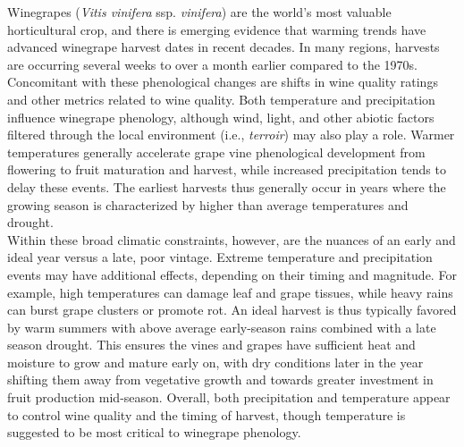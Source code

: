 \documentclass[final]{nature}
\begin{document}
\noindent Winegrapes (\emph{Vitis vinifera} ssp. \emph{vinifera}) are the world's most valuable horticultural crop, and there is emerging evidence that warming trends have advanced winegrape harvest dates in recent decades\cite{Jones:2000br,schultzjones,tomasi2011,odo2012,webb2012}. In many regions, harvests are occurring several weeks to over a month earlier compared to the 1970s\cite{Duchene:2005bd,Seguin2005,webb2011}. Concomitant with these phenological changes are shifts in wine quality ratings\cite{jones2005} and other metrics related to wine quality\cite{Jones:2000br,mori2007}. Both temperature and precipitation influence winegrape phenology, although wind, light, and other abiotic factors filtered through the local environment (i.e., \emph{terroir}) may also play a role\cite{Gladstones2011}. Warmer temperatures generally accelerate grape vine phenological development from flowering to fruit maturation and harvest, while increased precipitation tends to delay these events\cite{jones2013}. The earliest harvests thus generally occur in years where the growing season is characterized by higher than average temperatures and drought\cite{Jones:2000br}.\\
\indent Within these broad climatic constraints, however, are the nuances of an early and ideal year versus a late, poor vintage. Extreme temperature and precipitation events may have additional effects, depending on their timing and magnitude. For example, high temperatures can damage leaf and grape tissues\cite{greer2010,Gladstones2011}, while heavy rains can burst grape clusters or promote rot\cite{jones2013}. An ideal harvest is thus typically favored by warm summers with above average early-season rains combined with a late season drought. This ensures the vines and grapes have sufficient heat and moisture to grow and mature early on, with dry conditions later in the year shifting them away from vegetative growth and towards greater investment in fruit production mid-season\cite{chaves2010,jones2013,baciocco2014}. Overall, both precipitation\cite{vanlee2009} and temperature\cite{baciocco2014} appear to control wine quality and the timing of harvest\cite{odo2012,webb2012}, though temperature is suggested to be most critical to winegrape phenology\cite{coombe1987,jones2005}.\\
\end{document}
